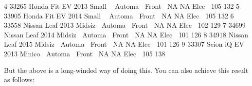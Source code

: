 \documentclass[
]{book}
\newenvironment{Shaded}{\begin{snugshade}}{\end{snugshade}}
\newcommand{\DecValTok}[1]{\textcolor[rgb]{0.00,0.00,0.81}{#1}}
\newcommand{\KeywordTok}[1]{\textcolor[rgb]{0.13,0.29,0.53}{\textbf{#1}}}
\newcommand{\NormalTok}[1]{#1}
\newcommand{\OperatorTok}[1]{\textcolor[rgb]{0.81,0.36,0.00}{\textbf{#1}}}
\newcommand{\OtherTok}[1]{\textcolor[rgb]{0.56,0.35,0.01}{#1}}
\newcommand{\StringTok}[1]{\textcolor[rgb]{0.31,0.60,0.02}{#1}}
\begin{document}
\begin{Shaded}
\begin{Highlighting}[]
\DecValTok{4} \DecValTok{33265}\NormalTok{ Honda  Fit EV  }\DecValTok{2013}\NormalTok{ Small }\OperatorTok{~}\StringTok{ }\NormalTok{Automa}\OperatorTok{~}\StringTok{ }\NormalTok{Front}\OperatorTok{~}\StringTok{    }\OtherTok{NA}    \OtherTok{NA}\NormalTok{ Elec}\OperatorTok{~}\StringTok{   }\DecValTok{105}   \DecValTok{132}
\DecValTok{5} \DecValTok{33905}\NormalTok{ Honda  Fit EV  }\DecValTok{2014}\NormalTok{ Small }\OperatorTok{~}\StringTok{ }\NormalTok{Automa}\OperatorTok{~}\StringTok{ }\NormalTok{Front}\OperatorTok{~}\StringTok{    }\OtherTok{NA}    \OtherTok{NA}\NormalTok{ Elec}\OperatorTok{~}\StringTok{   }\DecValTok{105}   \DecValTok{132}
\DecValTok{6} \DecValTok{33558}\NormalTok{ Nissan Leaf    }\DecValTok{2013}\NormalTok{ Midsiz}\OperatorTok{~}\StringTok{ }\NormalTok{Automa}\OperatorTok{~}\StringTok{ }\NormalTok{Front}\OperatorTok{~}\StringTok{    }\OtherTok{NA}    \OtherTok{NA}\NormalTok{ Elec}\OperatorTok{~}\StringTok{   }\DecValTok{102}   \DecValTok{129}
\DecValTok{7} \DecValTok{34699}\NormalTok{ Nissan Leaf    }\DecValTok{2014}\NormalTok{ Midsiz}\OperatorTok{~}\StringTok{ }\NormalTok{Automa}\OperatorTok{~}\StringTok{ }\NormalTok{Front}\OperatorTok{~}\StringTok{    }\OtherTok{NA}    \OtherTok{NA}\NormalTok{ Elec}\OperatorTok{~}\StringTok{   }\DecValTok{101}   \DecValTok{126}
\DecValTok{8} \DecValTok{34918}\NormalTok{ Nissan Leaf    }\DecValTok{2015}\NormalTok{ Midsiz}\OperatorTok{~}\StringTok{ }\NormalTok{Automa}\OperatorTok{~}\StringTok{ }\NormalTok{Front}\OperatorTok{~}\StringTok{    }\OtherTok{NA}    \OtherTok{NA}\NormalTok{ Elec}\OperatorTok{~}\StringTok{   }\DecValTok{101}   \DecValTok{126}
\DecValTok{9} \DecValTok{33307}\NormalTok{ Scion  iQ EV   }\DecValTok{2013}\NormalTok{ Minico}\OperatorTok{~}\StringTok{ }\NormalTok{Automa}\OperatorTok{~}\StringTok{ }\NormalTok{Front}\OperatorTok{~}\StringTok{    }\OtherTok{NA}    \OtherTok{NA}\NormalTok{ Elec}\OperatorTok{~}\StringTok{   }\DecValTok{105}   \DecValTok{138}
\end{Highlighting}
\end{Shaded}

But the above is a long-winded way of doing this. You can also achieve this result as follows:

\begin{Shaded}
\end{Shaded}
\end{document}
